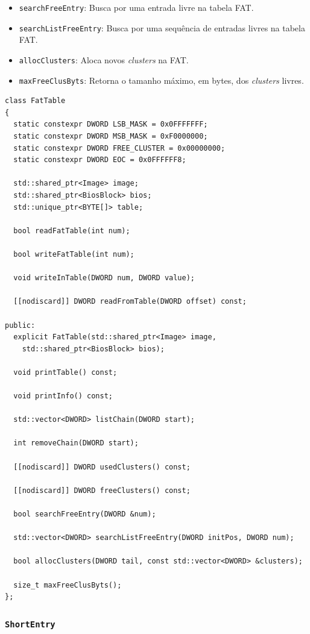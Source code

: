 \documentclass[
    12pt,				%
    oneside,   	        %
    a4paper,			%
    english,			%
    french,				%
    spanish,			%
    brazil,				%
    ]{pacotes/abntex2}
\begin{document}
\begin{itemize}
\begin{itemize}
            \item \texttt{searchFreeEntry}: Busca por uma entrada livre na tabela FAT.
            \item \texttt{searchListFreeEntry}: Busca por uma sequência de entradas livres na tabela FAT.
            \item \texttt{allocClusters}: Aloca novos \textit{clusters} na FAT.
            \item \texttt{maxFreeClusByts}: Retorna o tamanho máximo, em bytes, dos \textit{clusters} livres.
        \end{itemize}
\end{itemize}


\begin{lstlisting}[caption={Classe a estrutura FAT}, label={lst:fat_table}]
class FatTable
{
  static constexpr DWORD LSB_MASK = 0x0FFFFFFF;
  static constexpr DWORD MSB_MASK = 0xF0000000;
  static constexpr DWORD FREE_CLUSTER = 0x00000000;
  static constexpr DWORD EOC = 0x0FFFFFF8;
  
  std::shared_ptr<Image> image;
  std::shared_ptr<BiosBlock> bios;
  std::unique_ptr<BYTE[]> table;

  bool readFatTable(int num);

  bool writeFatTable(int num);

  void writeInTable(DWORD num, DWORD value);

  [[nodiscard]] DWORD readFromTable(DWORD offset) const;

public:
  explicit FatTable(std::shared_ptr<Image> image,
    std::shared_ptr<BiosBlock> bios);

  void printTable() const;

  void printInfo() const;

  std::vector<DWORD> listChain(DWORD start);

  int removeChain(DWORD start);

  [[nodiscard]] DWORD usedClusters() const;

  [[nodiscard]] DWORD freeClusters() const;

  bool searchFreeEntry(DWORD &num);

  std::vector<DWORD> searchListFreeEntry(DWORD initPos, DWORD num);

  bool allocClusters(DWORD tail, const std::vector<DWORD> &clusters);

  size_t maxFreeClusByts();
};
\end{lstlisting}

\subsubsection{\texttt{ShortEntry}}
\label{subsubsec:short_entry}
\end{document}
